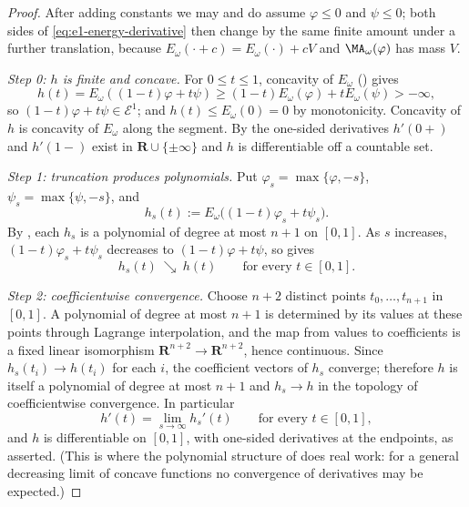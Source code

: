 \begin{proof}
After adding constants we may and do assume $\varphi\leq0$ and
$\psi\leq0$; both sides of \eqref{eq:e1-energy-derivative} then change by
the same finite amount under a further translation, because
$E_\omega(\cdot+c)=E_\omega(\cdot)+cV$ and
$\MA_\omega(\varphi)$ has mass $V$.

\emph{Step 0: $h$ is finite and concave.}
For $0\leq t\leq1$, concavity of $E_\omega$
() gives
\[
 h(t)=E_\omega((1-t)\varphi+t\psi)
 \geq(1-t)E_\omega(\varphi)+tE_\omega(\psi)>-\infty ,
\]
so $(1-t)\varphi+t\psi\in\mathcal E^1$; and $h(t)\leq E_\omega(0)=0$
by monotonicity.  Concavity of $h$ is concavity of $E_\omega$ along the
segment.  By  the one-sided derivatives
$h'(0+)$ and $h'(1-)$ exist in $\mathbf R\cup\{\pm\infty\}$ and
$h$ is differentiable off a countable set.

\emph{Step 1: truncation produces polynomials.}
Put $\varphi_s=\max\{\varphi,-s\}$, $\psi_s=\max\{\psi,-s\}$, and
\[
 h_s(t):=E_\omega\bigl((1-t)\varphi_s+t\psi_s\bigr).
\]
By , each $h_s$ is a polynomial of
degree at most $n+1$ on $[0,1]$.  As $s$ increases,
$(1-t)\varphi_s+t\psi_s$ decreases to $(1-t)\varphi+t\psi$, so
 gives
\[
 h_s(t)\ \searrow\ h(t)
 \qquad\text{for every }t\in[0,1].
\]

\emph{Step 2: coefficientwise convergence.}
Choose $n+2$ distinct points $t_0,\dots,t_{n+1}$ in $[0,1]$.  A
polynomial of degree at most $n+1$ is determined by its values at these
points through Lagrange interpolation, and the map from values to
coefficients is a fixed linear isomorphism
$\mathbf R^{n+2}\to\mathbf R^{n+2}$, hence continuous.  Since
$h_s(t_i)\to h(t_i)$ for each $i$, the coefficient vectors of $h_s$
converge; therefore $h$ is itself a polynomial of degree at most $n+1$
and $h_s\to h$ in the topology of coefficientwise convergence.  In
particular
\begin{equation}\label{eq:ch27-derivative-limit}
 h'(t)=\lim_{s\to\infty}h_s'(t)
 \qquad\text{for every }t\in[0,1],
\end{equation}
and $h$ is differentiable on $[0,1]$, with one-sided derivatives at the
endpoints, as asserted.  (This is where the polynomial structure of
 does real work: for a general decreasing
limit of concave functions no convergence of derivatives may be expected.)


\end{proof}

